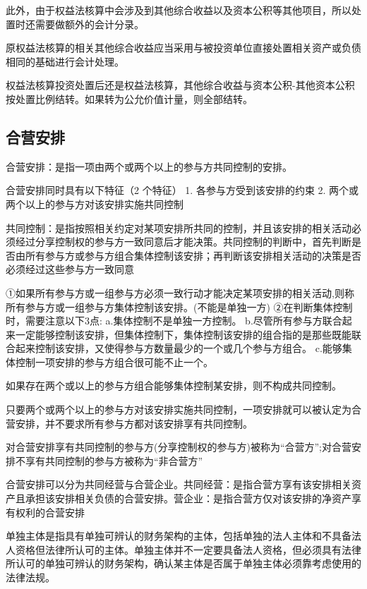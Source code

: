 \documentclass[UTF8,12pt]{ctexart}
\numberwithin{equation}{section} %
\numberwithin{figure}{section}
\numberwithin{table}{section}
\begin{document}
	此外，由于权益法核算中会涉及到其他综合收益以及资本公积等其他项目，所以处置时还需要做额外的会计分录。
	
	原权益法核算的相关其他综合收益应当采用与被投资单位直接处置相关资产或负债相同的基础进行会计处理。
	
	权益法核算投资处置后还是权益法核算，其他综合收益与资本公积-其他资本公积按处置比例结转。如果转为公允价值计量，则全部结转。
	
	
	
	\subsection{合营安排}
	合营安排：是指一项由两个或两个以上的参与方共同控制的安排。
	
	合营安排同时具有以下特征（2 个特征）
	1.	各参与方受到该安排的约束
	2.	两个或两个以上的参与方对该安排实施共同控制
	
	共同控制：是指按照相关约定对某项安排所共同的控制，并且该安排的相关活动必须经过分享控制权的参与方一致同意后才能决策。共同控制的判断中，首先判断是否由所有参与方或参与方组合集体控制该安排；再判断该安排相关活动的决策是否必须经过这些参与方一致同意
	
	①如果所有参与方或一组参与方必须一致行动才能决定某项安排的相关活动,则称所有参与方或一组参与方集体控制该安排。(不能是单独一方)
	②在判断集体控制时，需要注意以下3点:
	a.集体控制不是单独一方控制。
	b.尽管所有参与方联合起来一定能够控制该安排，但集体控制下，集体控制该安排的组合指的是那些既能联合起来控制该安排，又使得参与方数量最少的一个或几个参与方组合。
	c.能够集体控制一项安排的参与方组合很可能不止一个。
	
	如果存在两个或以上的参与方组合能够集体控制某安排，则不构成共同控制。
	
	只要两个或两个以上的参与方对该安排实施共同控制，一项安排就可以被认定为合营安排，并不要求所有参与方都对该安排享有共同控制。
	
	对合营安排享有共同控制的参与方(分享控制权的参与方)被称为“合营方”;对合营安排不享有共同控制的参与方被称为“非合营方”
	
	合营安排可以分为共同经营与合营企业。共同经营：是指合营方享有该安排相关资产且承担该安排相关负债的合营安排。营企业：是指合营方仅对该安排的净资产享有权利的合营安排
	
	单独主体是指具有单独可辨认的财务架构的主体，包括单独的法人主体和不具备法人资格但法律所认可的主体。单独主体并不一定要具备法人资格，但必须具有法律所认可的单独可辨认的财务架构，确认某主体是否属于单独主体必须靠考虑使用的法律法规。
	
\end{document}
